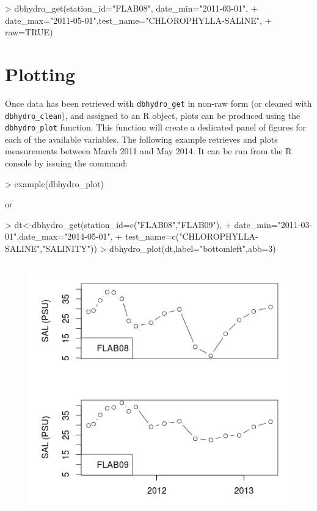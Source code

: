 \documentclass[12pt,notitlepage]{article}
\begin{document}
\begin{Schunk}
\begin{Sinput}
> dbhydro_get(station_id="FLAB08", date_min="2011-03-01",
+            date_max="2011-05-01",test_name="CHLOROPHYLLA-SALINE",
+            raw=TRUE)
\end{Sinput}
\end{Schunk}

\section{Plotting}

Once data has been retrieved with \verb|dbhydro_get| in non-raw form (or cleaned with \verb|dbhydro_clean|), and assigned to an R object, plots can be produced using the \verb|dbhydro_plot| function. This function will create a dedicated panel of figures for each of the available variables. The following example retrieves and plots measurements between March 2011 and May 2014. It can be run from the R console by issuing the command:

\begin{Schunk}
\begin{Sinput}
> example(dbhydro_plot)
\end{Sinput}
\end{Schunk}

or

\begin{Schunk}
\begin{Sinput}
> dt<-dbhydro_get(station_id=c("FLAB08","FLAB09"),
+                date_min="2011-03-01",date_max="2014-05-01",
+                test_name=c("CHLOROPHYLLA-SALINE","SALINITY"))
> dbhydro_plot(dt,label="bottomleft",abb=3)
\end{Sinput}
\end{Schunk}
\vspace{2pt}
\begin{figure}[H]
\begin{center}
\includegraphics[width=343.5pt,height=310.8pt]{Rplot}
\end{center}
\label{fig:zero}
\end{figure}
\end{document}
